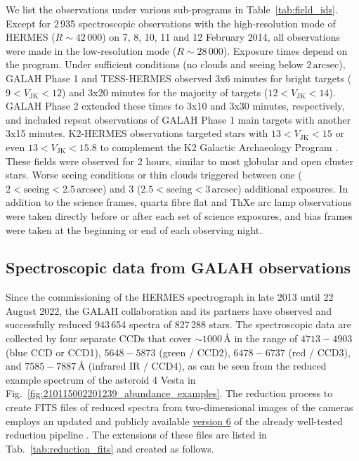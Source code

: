 \documentclass[
  journal=pasa,
  manuscript=research-paper, %
  year=2023,
  volume=37
]{cup-journal}
\begin{document}
We list the observations under various sub-programs in Table~\ref{tab:field_ids}. Except for 2\,935 spectroscopic observations with the high-resolution mode of HERMES ($R \sim 42\,000$) on 7, 8, 10, 11 and 12 February 2014, all observations were made in the low-resolution mode ($R \sim 28\,000$). Exposure times depend on the program. Under sufficient conditions (no clouds and seeing below $2\,\mathrm{arcsec}$), GALAH Phase 1 and TESS-HERMES observed 3x6 minutes for bright targets ($9 < V_\mathrm{JK} < 12$) and 3x20 minutes for the majority of targets ($12 < V_\mathrm{JK} < 14$). GALAH Phase 2 extended these times to 3x10 and 3x30 minutes, respectively, and included repeat observations of GALAH Phase 1 main targets with another 3x15 minutes. K2-HERMES observations targeted stars with $13 < V_\mathrm{JK} < 15$ or even $13 < V_\mathrm{JK} < 15.8$ to complement the K2 Galactic Archaeology Program \citep{Stello2015}. These fields were observed for 2 hours, similar to most globular and open cluster stars. Worse seeing conditions or thin clouds triggered between one ($2 < \mathrm{seeing} < 2.5\,\mathrm{arcsec}$) and 3 ($2.5 < \mathrm{seeing} < 3\,\mathrm{arcsec}$) additional exposures. In addition to the science frames, quartz fibre flat and ThXe arc lamp observations were taken directly before or after each set of science exposures, and bias frames were taken at the beginning or end of each observing night.

\subsection{Spectroscopic data from GALAH observations}
\label{sec:spectroscopic_data_from_galah_observations}

Since the commissioning of the HERMES spectrograph in late 2013 until 22 August 2022, the GALAH collaboration and its partners have observed and successfully reduced 943\,654 spectra of 827\,288 stars. The spectroscopic data are collected by four separate CCDs that cover $\sim 1000\,\text{\AA}$ in the range of $4713-4903$ (blue CCD or CCD1), $5648-5873$ (green / CCD2), $6478-6737$ (red / CCD3), and $7585-7887\,\text{\AA}$ (infrared IR / CCD4), as can be seen from the reduced example spectrum of the asteroid 4 Vesta in Fig.~\ref{fig:210115002201239_abundance_examples}. The reduction process to create FITS files of reduced spectra from two-dimensional images of the cameras employs an updated and publicly available \href{https://github.com/sheliak/galah_reduction/blob/master/extract6.0.py}{version 6} of the already well-tested reduction pipeline \citep{Kos2017}. The extensions of these files are listed in Tab.~\ref{tab:reduction_fits} and created as follows.
\end{document}
